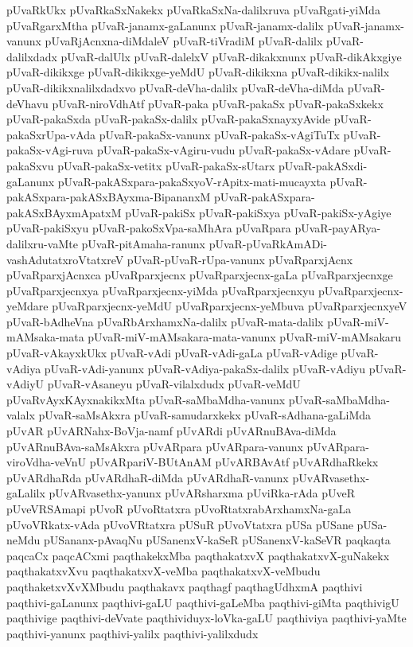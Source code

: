 {pUvaRkUkx
pUvaRkaSxNakekx
pUvaRkaSxNa-dalilxruva
pUvaRgati-yiMda
pUvaRgarxMtha
pUvaR-janamx-gaLanunx
pUvaR-janamx-dalilx
pUvaR-janamx-vanunx
pUvaRjAcnxna-diMdaleV
pUvaR-tiVradiM
pUvaR-dalilx
pUvaR-dalilxdadx
pUvaR-dalUlx
pUvaR-dalelxV
pUvaR-dikakxnunx
pUvaR-dikAkxgiye
pUvaR-dikikxge
pUvaR-dikikxge-yeMdU
pUvaR-dikikxna
pUvaR-dikikx-nalilx
pUvaR-dikikxnalilxdadxvo
pUvaR-deVha-dalilx
pUvaR-deVha-diMda
pUvaR-deVhavu
pUvaR-niroVdhAtf
pUvaR-paka
pUvaR-pakaSx
pUvaR-pakaSxkekx
pUvaR-pakaSxda
pUvaR-pakaSx-dalilx
pUvaR-pakaSxnayxyAvide
pUvaR-pakaSxrUpa-vAda
pUvaR-pakaSx-vanunx
pUvaR-pakaSx-vAgiTuTx
pUvaR-pakaSx-vAgi-ruva
pUvaR-pakaSx-vAgiru-vudu
pUvaR-pakaSx-vAdare
pUvaR-pakaSxvu
pUvaR-pakaSx-vetitx
pUvaR-pakaSx-sUtarx
pUvaR-pakASxdi-gaLanunx
pUvaR-pakASxpara-pakaSxyoV-rApitx-mati-mucayxta
pUvaR-pakASxpara-pakASxBAyxma-BipananxM
pUvaR-pakASxpara-pakASxBAyxmApatxM
pUvaR-pakiSx
pUvaR-pakiSxya
pUvaR-pakiSx-yAgiye
pUvaR-pakiSxyu
pUvaR-pakoSxVpa-saMhAra
pUvaRpara
pUvaR-payARya-dalilxru-vaMte
pUvaR-pitAmaha-ranunx
pUvaR-pUvaRkAmADi-vashAdutatxroVtatxreV
pUvaR-pUvaR-rUpa-vanunx
pUvaRparxjAcnx
pUvaRparxjAcnxca
pUvaRparxjecnx
pUvaRparxjecnx-gaLa
pUvaRparxjecnxge
pUvaRparxjecnxya
pUvaRparxjecnx-yiMda
pUvaRparxjecnxyu
pUvaRparxjecnx-yeMdare
pUvaRparxjecnx-yeMdU
pUvaRparxjecnx-yeMbuva
pUvaRparxjecnxyeV
pUvaR-bAdheVna
pUvaRbArxhamxNa-dalilx
pUvaR-mata-dalilx
pUvaR-miV-mAMsaka-mata
pUvaR-miV-mAMsakara-mata-vanunx
pUvaR-miV-mAMsakaru
pUvaR-vAkayxkUkx
pUvaR-vAdi
pUvaR-vAdi-gaLa
pUvaR-vAdige
pUvaR-vAdiya
pUvaR-vAdi-yanunx
pUvaR-vAdiya-pakaSx-dalilx
pUvaR-vAdiyu
pUvaR-vAdiyU
pUvaR-vAsaneyu
pUvaR-vilalxdudx
pUvaR-veMdU
pUvaRvAyxKAyxnakikxMta
pUvaR-saMbaMdha-vanunx
pUvaR-saMbaMdha-valalx
pUvaR-saMsAkxra
pUvaR-samudarxkekx
pUvaR-sAdhana-gaLiMda
pUvAR
pUvARNahx-BoVja-namf
pUvARdi
pUvARnuBAva-diMda
pUvARnuBAva-saMsAkxra
pUvARpara
pUvARpara-vanunx
pUvARpara-viroVdha-veVnU
pUvARpariV-BUtAnAM
pUvARBAvAtf
pUvARdhaRkekx
pUvARdhaRda
pUvARdhaR-diMda
pUvARdhaR-vanunx
pUvARvasethx-gaLalilx
pUvARvasethx-yanunx
pUvARsharxma
pUviRka-rAda
pUveR
pUveVRSAmapi
pUvoR
pUvoRtatxra
pUvoRtatxrabArxhamxNa-gaLa
pUvoVRkatx-vAda
pUvoVRtatxra
pUSuR
pUvoVtatxra
pUSa
pUSane
pUSa-neMdu
pUSananx-pAvaqNu
pUSanenxV-kaSeR
pUSanenxV-kaSeVR
paqkaqta
paqcaCx
paqcACxmi
paqthakekxMba
paqthakatxvX
paqthakatxvX-guNakekx
paqthakatxvXvu
paqthakatxvX-veMba
paqthakatxvX-veMbudu
paqthaketxvXvXMbudu
paqthakavx
paqthagf
paqthagUdhxmA
paqthivi
paqthivi-gaLanunx
paqthivi-gaLU
paqthivi-gaLeMba
paqthivi-giMta
paqthivigU
paqthivige
paqthivi-deVvate
paqthividuyx-loVka-gaLU
paqthiviya
paqthivi-yaMte
paqthivi-yanunx
paqthivi-yalilx
paqthivi-yalilxdudx
}
